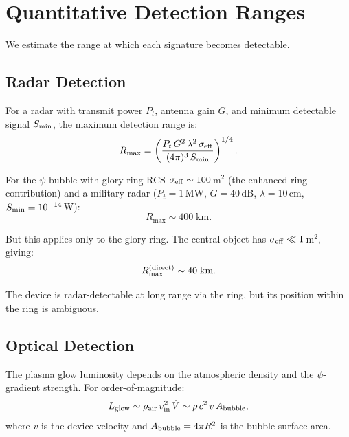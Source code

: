 \documentclass[11pt]{article}
\begin{document}
\section{Quantitative Detection Ranges}\label{sec:detection}

We estimate the range at which each signature becomes detectable.

\subsection{Radar Detection}

For a radar with transmit power $P_t$, antenna gain $G$, and minimum
detectable signal $S_{\rm min}$, the maximum detection range is:
\begin{equation}
R_{\max} = \left(\frac{P_t\,G^2\,\lambda^2\,\sigma_{\rm eff}}
  {(4\pi)^3\,S_{\rm min}}\right)^{1/4}.
\end{equation}

For the $\psi$-bubble with glory-ring RCS $\sigma_{\rm eff} \sim 100$\,m$^2$
(the enhanced ring contribution) and a military radar ($P_t = 1$\,MW,
$G = 40$\,dB, $\lambda = 10$\,cm, $S_{\rm min} = 10^{-14}$\,W):
\begin{equation}
R_{\max} \sim 400\;\text{km}.
\end{equation}

But this applies only to the glory ring. The central object has
$\sigma_{\rm eff} \ll 1$\,m$^2$, giving:
\begin{equation}
R_{\max}^{\rm (direct)} \sim 40\;\text{km}.
\end{equation}

The device is radar-detectable at long range via the ring, but its
position within the ring is ambiguous.

\subsection{Optical Detection}

The plasma glow luminosity depends on the atmospheric density and the
$\psi$-gradient strength. For order-of-magnitude:
\begin{equation}
L_{\rm glow} \sim \rho_{\rm air}\,v_{\rm in}^2\,\dot{V}
  \sim \rho\,c^2\,v\,A_{\rm bubble},
\end{equation}
where $v$ is the device velocity and $A_{\rm bubble} = 4\pi R^2$ is
the bubble surface area.
\end{document}
